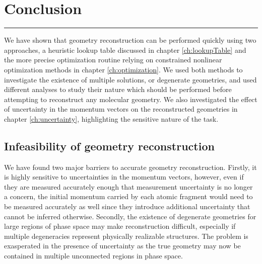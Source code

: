 \chapter{Conclusion}\label{ch:conclusion}

\vspace{-1.5 em}
\begin{addmargin}[-0.5cm]{0cm}
  \minitoc
\end{addmargin}
\hrule
\vspace{1.5 em}

We have shown that geometry reconstruction can be performed quickly using two approaches, a heuristic lookup table discussed in chapter \ref{ch:lookupTable} and the more precise optimization routine relying on constrained nonlinear optimization methods in chapter \ref{ch:optimization}. We used both methods to investigate the existence of multiple solutions, or degenerate geometries, and used different analyses to study their nature which should be performed before attempting to reconstruct any molecular geometry. We also investigated the effect of uncertainty in the momentum vectors on the reconstructed geometries in chapter \ref{ch:uncertainty}, highlighting the sensitive nature of the task.

\section*{Infeasibility of geometry reconstruction}
We have found two major barriers to accurate geometry reconstruction. Firstly, it is highly sensitive to uncertainties in the momentum vectors, however, even if they are measured accurately enough that measurement uncertainty is no longer a concern, the initial momentum carried by each atomic fragment would need to be measured accurately as well since they introduce additional uncertainty that cannot be inferred otherwise. Secondly, the existence of degenerate geometries for large regions of phase space may make reconstruction difficult, especially if multiple degeneracies represent physically realizable structures. The problem is exasperated in the presence of uncertainty as the true geometry may now be contained in multiple unconnected regions in phase space.

